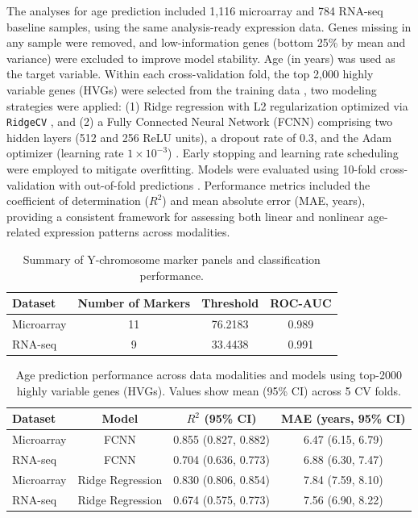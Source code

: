 \documentclass[
  12pt]{article}
\begin{document}
The analyses for age prediction included 1{,}116 microarray and 784 RNA-seq baseline samples, using the same analysis-ready expression data. Genes missing in any sample were removed, and low-information genes (bottom 25\% by mean and variance) were excluded to improve model stability. Age (in years) was used as the target variable. Within each cross-validation fold, the top 2{,}000 highly variable genes (HVGs) were selected from the training data \citep{yip2017evaluation}, two modeling strategies were applied: (1) Ridge regression with L2 regularization optimized via \texttt{RidgeCV} \citep{hoerl1970ridge,scikit-learn}, and (2) a Fully Connected Neural Network (FCNN) comprising two hidden layers (512 and 256 ReLU units), a dropout rate of 0.3, and the Adam optimizer (learning rate $1\times10^{-3}$) \citep{chollet2015keras,kingma2014adam}. Early stopping and learning rate scheduling were employed to mitigate overfitting. Models were evaluated using 10-fold cross-validation with out-of-fold predictions \citep{arlot2010survey}. Performance metrics included the coefficient of determination ($R^2$) and mean absolute error (MAE, years), providing a consistent framework for assessing both linear and nonlinear age-related expression patterns across modalities.

\begin{table}[ht]
\centering
\caption{Summary of Y-chromosome marker panels and classification performance.}
\begin{tabular}{lccc}
\hline
\textbf{Dataset} & \textbf{Number of Markers} & \textbf{Threshold} & \textbf{ROC-AUC} \\
\hline
Microarray & 11 & 76.2183 & 0.989 \\
RNA-seq & 9 & 33.4438 & 0.991 \\
\hline
\end{tabular}
\label{tab:sex_marker_auc}
\end{table}

\begin{table}[ht]
\centering
\caption{Age prediction performance across data modalities and models using top-2000 highly variable genes (HVGs). Values show mean (95\% CI) across 5 CV folds.}
\begin{tabular}{lccc}
\hline
\textbf{Dataset} & \textbf{Model} & \textbf{$R^2$ (95\% CI)} & \textbf{MAE (years, 95\% CI)} \\
\hline
Microarray & FCNN & 0.855 (0.827, 0.882) & 6.47 (6.15, 6.79) \\
RNA-seq & FCNN & 0.704 (0.636, 0.773) & 6.88 (6.30, 7.47) \\
Microarray & Ridge Regression & 0.830 (0.806, 0.854) & 7.84 (7.59, 8.10) \\
RNA-seq & Ridge Regression & 0.674 (0.575, 0.773) & 7.56 (6.90, 8.22) \\
\hline
\end{tabular}
\label{tab:age_prediction}
\end{table}
\end{document}
